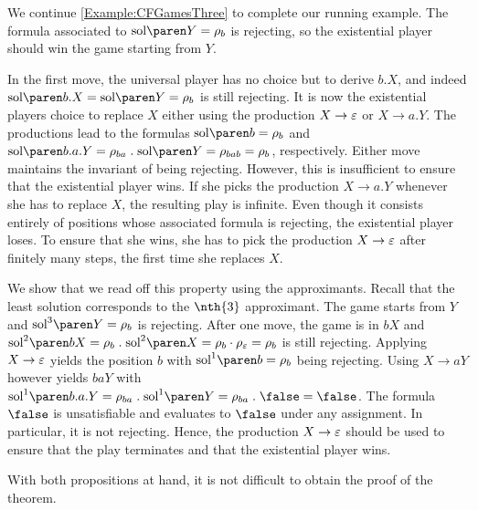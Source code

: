\documentclass[../../diss.tex]{subfiles}
\begin{document}
\begin{example}%
\label{Example:CFGamesFour}%
    We continue \cref{Example:CFGamesThree} to complete our running example.
    The formula associated to $\sol{Y} = \tbox{b}$ is rejecting, so the existential player should win the game starting from $Y$.

    In the first move, the universal player has no choice but to derive $b.X$, and indeed $\sol{b.X} = \sol{Y} = \tbox{b}$ is still rejecting.
    It is now the existential players choice to replace $X$ either using the production $X \to \varepsilon$ or $X \to a.Y$.
    The productions lead to the formulas $\sol{b} = \tbox{b}$ and $\sol{b.a.Y} = \tbox{ba} \comp \sol{Y} = \tbox{bab} = \tbox{b}$, respectively.
    Either move maintains the invariant of being rejecting.
    However, this is insufficient to ensure that the existential player wins.
    If she picks the production $X \to a.Y$ whenever she has to replace $X$, the resulting play is infinite.
    Even though it consists entirely of positions whose associated formula is rejecting, the existential player loses.
    To ensure that she wins, she has to pick the production $X \to \varepsilon$ after finitely many steps, \eg the first time she replaces $X$.

    We show that we read off this property using the approximants.
    Recall that the least solution corresponds to the $\nth{3}$ approximant.
    The game starts from $Y$ and $\sol{3}{Y} = \tbox{b}$ is rejecting.
    After one move, the game is in $bX$ and $\sol{2}{bX} = \tbox{b} \comp \sol{2}{X} = \tbox{b} \cdot \tbox{\eps} = \tbox{b}$ is still rejecting.
    Applying $X \to \varepsilon$ yields the position $b$ with $\sol{1}{b} = \tbox{b}$ being rejecting.
    Using $X \to aY$ however yields $baY$ with $\sol{1}{b.a.Y} = \tbox{ba} \comp \sol{1}{Y} = \tbox{ba} \comp \false = \false$.
    The formula $\false$ is unsatisfiable and evaluates to $\false$ under any assignment.
    In particular, it is not rejecting.
    Hence, the production $X \to \varepsilon$ should be used to ensure that the play terminates and that the existential player wins.
\end{example}

With both propositions at hand, it is not difficult to obtain the proof of the theorem.
\end{document}

